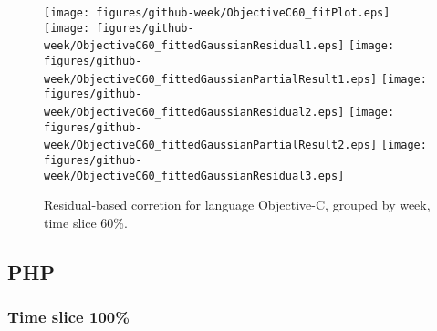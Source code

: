 \begin{figure}[t]
\centering
{}
{\texttt{[image: figures/github-week/ObjectiveC60\_fitPlot.eps]}}
{\texttt{[image: figures/github-week/ObjectiveC60\_fittedGaussianResidual1.eps]}}
{\texttt{[image: figures/github-week/ObjectiveC60\_fittedGaussianPartialResult1.eps]}}
{\texttt{[image: figures/github-week/ObjectiveC60\_fittedGaussianResidual2.eps]}}
{\texttt{[image: figures/github-week/ObjectiveC60\_fittedGaussianPartialResult2.eps]}}
{\texttt{[image: figures/github-week/ObjectiveC60\_fittedGaussianResidual3.eps]}}
\caption{Residual-based corretion for language Objective-C, grouped by week, time slice 60\%.}
\end{figure}


\FloatBarrier


\subsection{PHP}

\subsubsection{Time slice 100\%}

